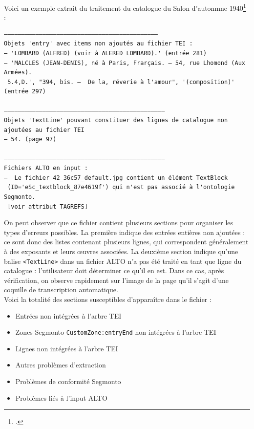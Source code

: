 \documentclass[a4paper,12pt,twoside]{book}
\begin{document}
 Voici un exemple extrait du traitement du catalogue du Salon d'autonmne 1940\footcite{salondautomneCatalogueOuvragesPeinture1940} : 

\begin{footnotesize}
	\begin{verbatim}
––––––––––––––––––––––––––––––––––––––––––––
Objets 'entry' avec items non ajoutés au fichier TEI : 
– 'LOMBARD (ALFRED) (voir à ALERED LOMBARD).' (entrée 281)
– 'MALCLES (JEAN-DENIS), né à Paris, Frarçais. — 54, rue Lhomond (Aux Armées). 
 5.4,D.', "394, bis. —  De la, réverie à l'amour", '(composition)' (entrée 297)

––––––––––––––––––––––––––––––––––––––––––––––
Objets 'TextLine' pouvant constituer des lignes de catalogue non ajoutées au fichier TEI 
– 54. (page 97)

––––––––––––––––––––––––––––––––––––––––––––––
Fichiers ALTO en input :
–  Le fichier 42_36c57_default.jpg contient un élément TextBlock
 (ID='eSc_textblock_87e4619f') qui n'est pas associé à l'ontologie Segmonto. 
 [voir attribut TAGREFS]	
	\end{verbatim}
\end{footnotesize}

On peut observer que ce fichier contient plusieurs sections pour organiser les types d'erreurs possibles. La première indique des entrées entières non ajoutées : ce sont donc des listes contenant plusieurs lignes, qui correspondent généralement à des exposants et leurs œuvres associées. La deuxième section indique qu'une balise \texttt{<TextLine>} dans un fichier ALTO n'a pas été traité en tant que ligne du catalogue : l'utilisateur doit déterminer ce qu'il en est. Dans ce cas, après vérification, on observe rapidement sur l'image de la page qu'il s'agit d'une coquille de transcription automatique.\\

Voici la totalité des sections susceptibles d'apparaître dans le fichier : 
\begin{itemize}
	\item Entrées non intégrées à l'arbre TEI
	\item Zones Segmonto \texttt{CustomZone:entryEnd} non intégrées à l'arbre TEI
	\item Lignes non intégrées à l'arbre TEI
	\item Autres problèmes d'extraction
	\item Problèmes de conformité Segmonto
	\item Problèmes liés à l'input ALTO
\end{itemize}
\end{document}
